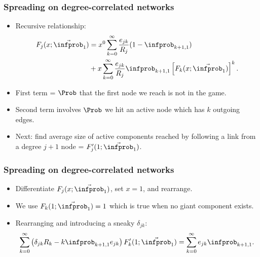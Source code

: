 \begin{frame}
  \frametitle{Spreading on degree-correlated networks}

  \begin{itemize}
  \item Recursive relationship:
    \begin{align}
      \nonumber
      F_j(x;\vec{\infprob}_1)
      & =
      x^{0}
      \sum_{k=0}^{\infty} 
      \frac{e_{jk}}{R_j}
      ( 1 - \infprob_{k+1,1} )
      \\ 
      \nonumber
      & +
      x
      \sum_{k=0}^{\infty} 
      \frac{e_{jk}}{R_j}
      \infprob_{k+1,1}
      \left[
        F_k(x;\vec{\infprob}_1)
      \right]^k.
    \end{align}
  \item<2->
    \alert{First term} =
    $\Prob$ that the first node we reach is not in the game.
  \item<3->
    \alert{Second term} involves
    $\Prob$ we hit an active node which has $k$ outgoing edges.
  \item<4->
    Next: find average size of active components reached
    by following a link from a degree $j+1$ node = $F_{j}'(1;\vec{\infprob}_1)$.
  \end{itemize}

\end{frame}


\begin{frame}
  \frametitle{Spreading on degree-correlated networks}

  \begin{itemize}
  \item<1->
    Differentiate $F_{j}(x;\vec{\infprob}_1)$,
    set $x=1$, and rearrange.
  \item<2->
    We use $F_k(1;\vec{\infprob}_1)=1$ which
    is true when no giant component exists.
    \item<4->
      Rearranging and introducing a sneaky $\delta_{jk}$:
      $$
      \sum_{k=0}^\infty
      \left(
        \delta_{jk} R_k 
        -
        k \infprob_{k+1,1} e_{jk}
      \right)
      F_k'(1;\vec{\infprob}_1)
      =
      \sum_{k=0}^{\infty}
      e_{jk}
      \infprob_{k+1,1}.
      $$
  \end{itemize}
  
\end{frame}


